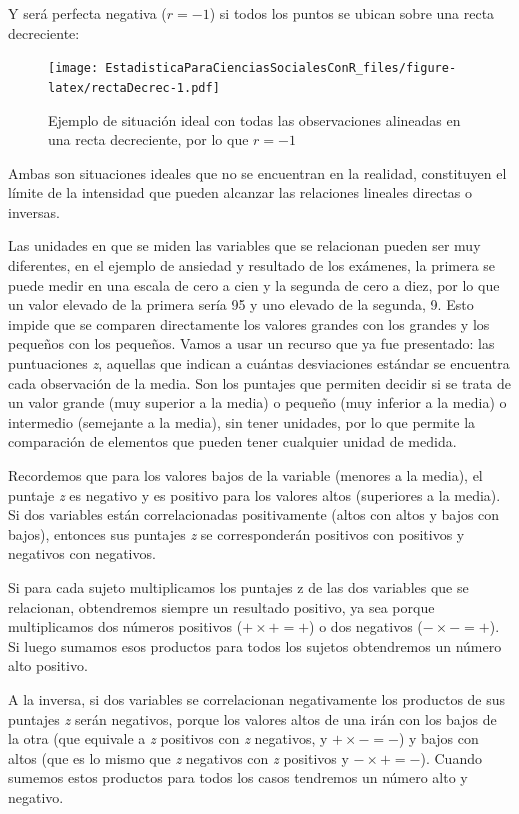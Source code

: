 \documentclass[]{book}
\begin{document}
Y será perfecta negativa (\(r = - 1\)) si todos los puntos se ubican sobre una recta decreciente:

\begin{figure}
\centering
\texttt{[image: EstadisticaParaCienciasSocialesConR\_files/figure-latex/rectaDecrec-1.pdf]}
\caption{\label{fig:rectaDecrec}Ejemplo de situación ideal con todas las observaciones alineadas en una recta decreciente, por lo que \(r = - 1\)}
\end{figure}

Ambas son situaciones ideales que no se encuentran en la realidad,
constituyen el límite de la intensidad que pueden alcanzar las
relaciones lineales directas o inversas.

Las unidades en que se miden las variables que se relacionan pueden ser
muy diferentes, en el ejemplo de ansiedad y resultado de los exámenes,
la primera se puede medir en una escala de cero a cien y la segunda de cero a diez, por lo que
un valor elevado de la primera sería 95 y uno elevado de la segunda, 9.
Esto impide que se comparen directamente los valores grandes con los
grandes y los pequeños con los pequeños. Vamos a usar un recurso que ya fue presentado: las puntuaciones \emph{z}, aquellas que indican a cuántas desviaciones estándar se encuentra cada observación de la media. Son los puntajes que permiten decidir si se trata de un valor grande (muy superior a la media) o pequeño (muy inferior a la media) o intermedio (semejante a la media), sin tener unidades, por lo que permite la comparación de elementos que pueden tener cualquier unidad de medida.

Recordemos que para los valores bajos de la variable (menores a la media), el puntaje \emph{z} es negativo y es positivo para los valores altos (superiores a la media). Si dos variables están correlacionadas
positivamente (altos con altos y bajos con bajos), entonces sus puntajes \emph{z} se corresponderán positivos con positivos y negativos con negativos.

Si para cada sujeto multiplicamos los puntajes z de las dos variables
que se relacionan, obtendremos siempre un resultado positivo, ya sea
porque multiplicamos dos números positivos (\(+\times+=+\)) o dos negativos (\(-\times-=+\)). Si luego sumamos esos productos para todos los sujetos obtendremos un número alto positivo.

A la inversa, si dos variables se correlacionan negativamente los productos de sus puntajes \emph{z} serán negativos, porque los valores altos de una irán con los bajos de la otra (que equivale a \emph{z} positivos con \emph{z} negativos, y \(+\times-=-\)) y bajos con altos (que es lo mismo que \emph{z} negativos con \emph{z} positivos y \(-\times+=-\)). Cuando sumemos estos productos para todos los casos tendremos un número alto y negativo.
\end{document}
